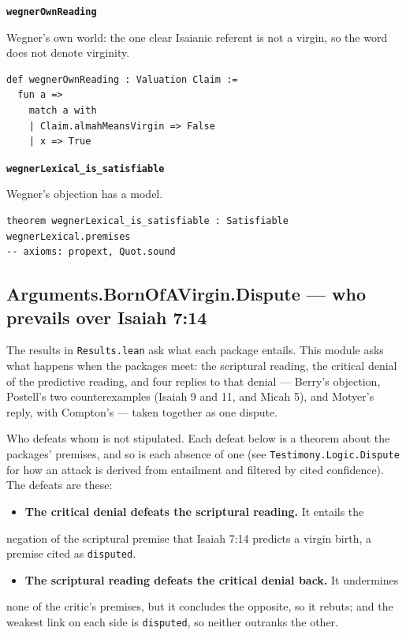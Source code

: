 \documentclass[11pt]{article}
\begin{document}
\par\medskip\noindent\textbf{\texttt{wegner\allowbreak{}Own\allowbreak{}Reading}}\par\nobreak\noindent
Wegner's own world: the one clear Isaianic referent is not a virgin, so the word does not denote virginity.

{\small\begin{verbatim}
def wegnerOwnReading : Valuation Claim :=
  fun a =>
    match a with
    | Claim.almahMeansVirgin => False
    | x => True
\end{verbatim}}
\par\medskip\noindent\textbf{\texttt{wegner\allowbreak{}Lexical\_\allowbreak{}is\_\allowbreak{}satisfiable}}\par\nobreak\noindent
Wegner's objection has a model.

{\small\begin{verbatim}
theorem wegnerLexical_is_satisfiable : Satisfiable wegnerLexical.premises
-- axioms: propext, Quot.sound
\end{verbatim}}
\subsection*{Arguments.BornOfAVirgin.Dispute — who prevails over Isaiah 7:14}
The results in \texttt{Results.lean} ask what each package entails. This module asks what happens when the packages meet: the scriptural reading, the critical denial of the predictive reading, and four replies to that denial — Berry's objection, Postell's two counterexamples (Isaiah 9 and 11, and Micah 5), and Motyer's reply, with Compton's — taken together as one dispute.

Who defeats whom is not stipulated. Each defeat below is a theorem about the packages' premises, and so is each absence of one (see \texttt{Testimony.Logic.Dispute} for how an attack is derived from entailment and filtered by cited confidence). The defeats are these:

\begin{itemize}
  \item \textbf{The critical denial defeats the scriptural reading.} It entails the
\end{itemize}
  negation of the scriptural premise that Isaiah 7:14 predicts a virgin birth,   a premise cited as \texttt{disputed}.

\begin{itemize}
  \item \textbf{The scriptural reading defeats the critical denial back.} It undermines
\end{itemize}
  none of the critic's premises, but it concludes the opposite, so it rebuts;   and the weakest link on each side is \texttt{disputed}, so neither outranks the   other.
\end{document}
